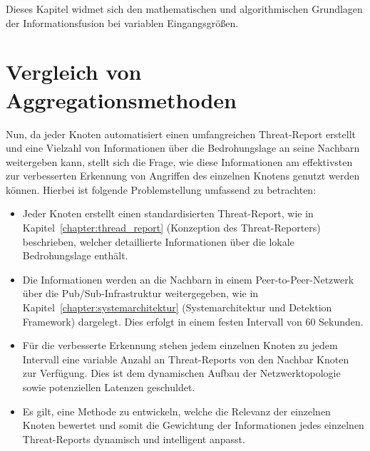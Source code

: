 Dieses Kapitel widmet sich den mathematischen und algorithmischen Grundlagen der Informationsfusion bei variablen Eingangsgrößen. 

\section{Vergleich von Aggregationsmethoden}
    \label{sec:vergleich_aggregationsmethoden}
    Nun, da jeder Knoten automatisiert einen umfangreichen Threat-Report erstellt und eine Vielzahl von Informationen über die Bedrohungslage an seine Nachbarn weitergeben kann, stellt sich die Frage, wie diese Informationen am effektivsten zur verbesserten Erkennung von Angriffen des einzelnen Knotens genutzt werden können. 
    Hierbei ist folgende Problemstellung umfassend zu betrachten:
    
    \begin{itemize}
        \item Jeder Knoten erstellt einen standardisierten Threat-Report, wie in Kapitel~\ref{chapter:thread_report} (Konzeption des Threat-Reporters) beschrieben, welcher detaillierte Informationen über die lokale Bedrohungslage enthält.
        \item Die Informationen werden an die Nachbarn in einem Peer-to-Peer-Netzwerk über die Pub/Sub-Infrastruktur weitergegeben, wie in Kapitel~\ref{chapter:systemarchitektur} (Systemarchitektur und Detektion Framework) dargelegt. Dies erfolgt in einem festen Intervall von 60 Sekunden.
        \item Für die verbesserte Erkennung stehen jedem einzelnen Knoten zu jedem Intervall eine variable Anzahl an Threat-Reports von den Nachbar Knoten zur Verfügung. Dies ist dem dynamischen Aufbau der Netzwerktopologie sowie potenziellen Latenzen geschuldet.
        \item Es gilt, eine Methode zu entwickeln, welche die Relevanz der einzelnen Knoten bewertet und somit die Gewichtung der Informationen jedes einzelnen Threat-Reports dynamisch und intelligent anpasst.
    \end{itemize}

